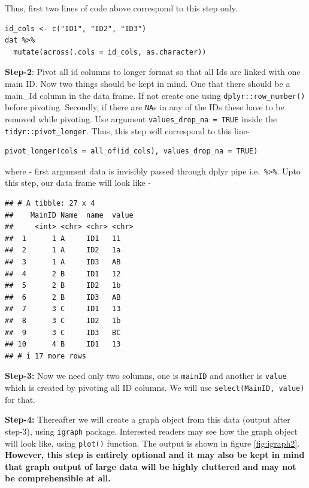 \documentclass[
]{book}
\begin{document}
Thus, first two lines of code above correspond to this step only.

\begin{verbatim}
id_cols <- c("ID1", "ID2", "ID3")
dat %>%
  mutate(across(.cols = id_cols, as.character))
\end{verbatim}

\textbf{Step-2}: Pivot all id columns to longer format so that all Ids are linked with one main ID. Now two things should be kept in mind. One that there should be a main\_Id column in the data frame. If not create one using \texttt{dplyr::row\_number()} before pivoting. Secondly, if there are \texttt{NA}s in any of the IDs these have to be removed while pivoting. Use argument \texttt{values\_drop\_na\ =\ TRUE} inside the \texttt{tidyr::pivot\_longer}. Thus, this step will correspond to this line-

\begin{verbatim}
pivot_longer(cols = all_of(id_cols), values_drop_na = TRUE)
\end{verbatim}

where - first argument data is invisibly passed through dplyr pipe i.e.~\texttt{\%\textgreater{}\%}. Upto this step, our data frame will look like -

\begin{verbatim}
## # A tibble: 27 x 4
##    MainID Name  name  value
##     <int> <chr> <chr> <chr>
##  1      1 A     ID1   11   
##  2      1 A     ID2   1a   
##  3      1 A     ID3   AB   
##  4      2 B     ID1   12   
##  5      2 B     ID2   1b   
##  6      2 B     ID3   AB   
##  7      3 C     ID1   13   
##  8      3 C     ID2   1b   
##  9      3 C     ID3   BC   
## 10      4 B     ID1   13   
## # i 17 more rows
\end{verbatim}

\textbf{Step-3:} Now we need only two columns, one is \texttt{mainID} and another is \texttt{value} which is created by pivoting all ID columns. We will use \texttt{select(MainID,\ value)} for that.

\textbf{Step-4:} Thereafter we will create a graph object from this data (output after step-3), using \texttt{igraph} package. Interested readers may see how the graph object will look like, using \texttt{plot()} function. The output is shown in figure \ref{fig:igraph2}. \textbf{However, this step is entirely optional and it may also be kept in mind that graph output of large data will be highly cluttered and may not be comprehensible at all.}
\end{document}
